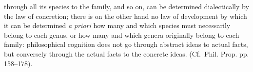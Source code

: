 \documentclass[12pt,a4paper]{book}
\begin{document}
\setcounter{footnote}{0}
through all its species to the family, and so on, can be determined dialectically
by the law of concretion; there is on the other hand no law of development by
which it can be determined \textit{a priori} how many and which species must
necessarily belong to each genus, or how many and which genera originally belong
to each family: philosophical cognition does not go through abstract ideas to
actual facts, but conversely through the actual facts to the concrete ideas.
(Cf.\ Phil. Prop. pp. 158--178).
\end{document}
